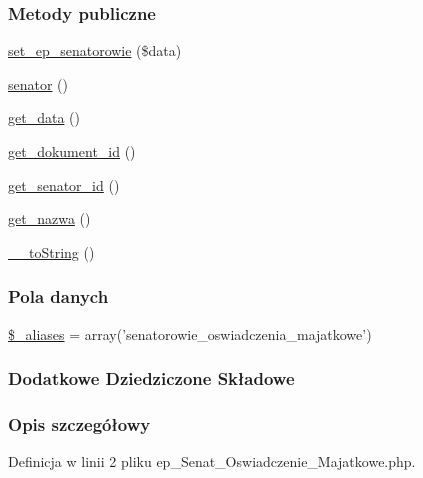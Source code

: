 \subsubsection*{Metody publiczne}
\begin{DoxyCompactItemize}
\item 
\hyperlink{classep___senat___oswiadczenie___majatkowe_a92c4ef3c275a33bee3292b42c47233cd}{set\-\_\-ep\-\_\-senatorowie} (\$data)
\item 
\hyperlink{classep___senat___oswiadczenie___majatkowe_af076312b536f7707cda87563bd9113d9}{senator} ()
\item 
\hyperlink{classep___senat___oswiadczenie___majatkowe_ab5976d1ba325a739761c2eb6662f58a9}{get\-\_\-data} ()
\item 
\hyperlink{classep___senat___oswiadczenie___majatkowe_adc3366b534d8e1e2570fd6a80624d7ed}{get\-\_\-dokument\-\_\-id} ()
\item 
\hyperlink{classep___senat___oswiadczenie___majatkowe_aa0c141b1e9aba9fed3eb13ed8901de76}{get\-\_\-senator\-\_\-id} ()
\item 
\hyperlink{classep___senat___oswiadczenie___majatkowe_ac0818f0049d7b84f08f77128f54cee36}{get\-\_\-nazwa} ()
\item 
\hyperlink{classep___senat___oswiadczenie___majatkowe_a7516ca30af0db3cdbf9a7739b48ce91d}{\-\_\-\-\_\-to\-String} ()
\end{DoxyCompactItemize}
\subsubsection*{Pola danych}
\begin{DoxyCompactItemize}
\item 
\hyperlink{classep___senat___oswiadczenie___majatkowe_ab4e31d75f0bc5d512456911e5d01366b}{\$\-\_\-aliases} = array('senatorowie\-\_\-oswiadczenia\-\_\-majatkowe')
\end{DoxyCompactItemize}
\subsubsection*{Dodatkowe Dziedziczone Składowe}


\subsubsection{Opis szczegółowy}


Definicja w linii 2 pliku ep\-\_\-\-Senat\-\_\-\-Oswiadczenie\-\_\-\-Majatkowe.\-php.



